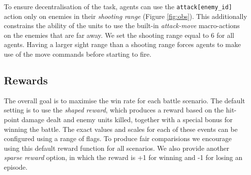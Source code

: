 To ensure decentralisation of the task, agents can use the \texttt{attack[enemy\_id]} action only on enemies in their \textit{shooting range} (Figure \ref{fig:obs}).
This additionally constrains the ability of the units to use the built-in \emph{attack-move} macro-actions on the enemies that are far away. We set the shooting range equal to $6$ for all agents. Having a larger sight range than a shooting range forces agents to make use of the move commands before starting to fire.

\subsection*{Rewards}

The overall goal is to maximise the win rate for each battle scenario.
The default setting is to use the \textit{shaped reward}, which produces a reward based on the hit-point damage dealt and enemy units killed, together with a special bonus for winning the battle.
The exact values and scales for each of these events can be configured using a range of flags. 
To produce fair comparisions we encourage using this default reward function for all scenarios.
We also provide another \textit{sparse reward} option, in which the reward is +1 for winning and -1 for losing an episode.


